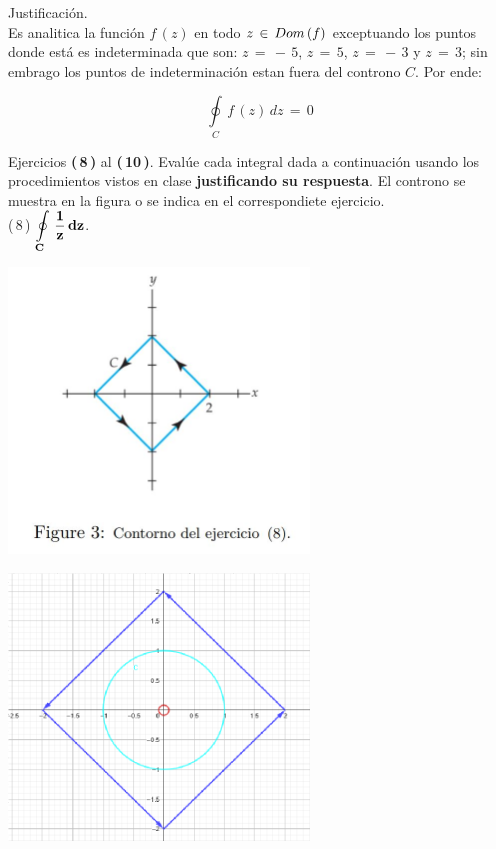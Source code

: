 \documentclass[a4paper,11pt,openany]{book}
\begin{document}
\textcolor{ao(english)}{} Justificación.\\

Es analitica la función $f\,(z)$ en todo $z\,\in\,\mathnormal{Dom\,(f)}$ exceptuando los puntos donde está es indeterminada que son: $z\,=\,-\,5$, $z\,=\,5$, $z\,=\,-\,3$ y $z\,=\,3$; sin embrago los puntos de indeterminación estan fuera del controno $C$. Por ende:

$$\oint\limits_{C}\,f\,(z)\,dz\,=\,0$$

Ejercicios \textbf{(\,8\,)} al \textbf{(\,10\,)}. Evalúe cada integral dada a continuación usando los procedimientos vistos en clase \textbf{justificando su respuesta}. El controno se muestra en la figura o se indica en el correspondiete ejercicio.\\

\textcolor{ao(english)}{(\,8\,)} $\bf{\displaystyle\oint\limits_{C}\,\dfrac{1}{z}\,dz}$.

\begin{center}
     \includegraphics[width=8cm]{figura-3.JPG}
\end{center}

\begin{center}
     \includegraphics[width=8cm]{Gra-Ej-8.png}
\end{center}
\end{document}
